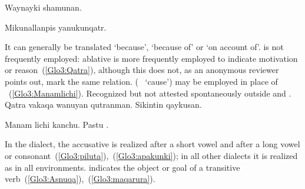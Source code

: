 %
{Waynayki shamunan.}%
{}%
{}{}%

%
{Mikunallanpis yanukunqatr.}%
{}%
{}{}%

\noindent
It can generally be translated ‘because’, ‘because of’ or ‘on account of’.  is not frequently employed: ablative  is more frequently employed to indicate motivation or reason~(\ref{Glo3:Qatra}), although this  does not, as an anonymous reviewer points out, mark the same relation.  (\Sp~ ‘cause’) may be employed in place of ~(\ref{Glo3:Manamlichi}). Recognized but not attested spontaneously outside \AMV{} and \CH.\\

%
{Qatra vakaqa wanuyan qutranman. Sikintin qaykusan.}%
{}%
{}{}%

%
{Manam lichi kanchu. Pastu .}%
{}%
{}{}%

In the \CH{} dialect, the accusative is realized  after a short vowel and  after a long vowel or consonant~(\ref{Glo3:piluta}),~(\ref{Glo3:apakunki}); in all other dialects it is realized as  in all environments.  indicates the object or goal of a transitive verb~(\ref{Glo3:Asnuqa}),~(\ref{Glo3:maqarura}).\\

